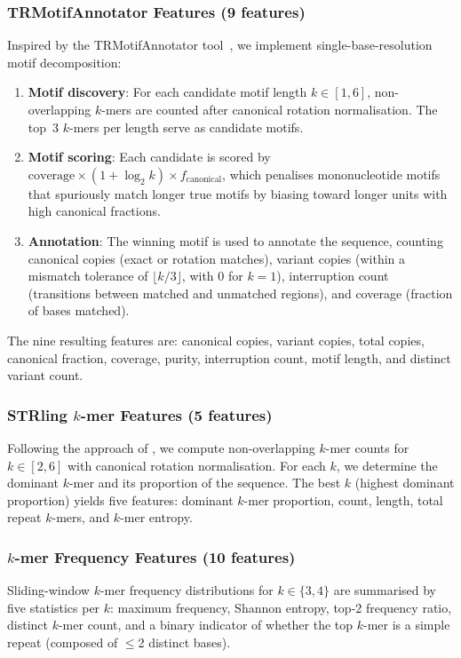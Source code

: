 \documentclass[11pt,twocolumn]{article}
\begin{document}
\subsubsection{TRMotifAnnotator Features (9 features)}
\label{sec:trmotif}
Inspired by the TRMotifAnnotator tool~\citep{wf-trs2025}, we implement
single-base-resolution motif decomposition:

\begin{enumerate}[nosep]
    \item \textbf{Motif discovery}: For each candidate motif length
          $k \in [1, 6]$, non-overlapping $k$-mers are counted after
          canonical rotation normalisation.  The top~3 $k$-mers per
          length serve as candidate motifs.
    \item \textbf{Motif scoring}: Each candidate is scored by
          $\text{coverage} \times (1 + \log_2 k) \times f_{\text{canonical}}$,
          which penalises mononucleotide motifs that spuriously match
          longer true motifs by biasing toward longer units with high
          canonical fractions.
    \item \textbf{Annotation}: The winning motif is used to annotate
          the sequence, counting canonical copies (exact or rotation
          matches), variant copies (within a mismatch tolerance of
          $\lfloor k/3 \rfloor$, with 0 for $k=1$), interruption
          count (transitions between matched and unmatched regions),
          and coverage (fraction of bases matched).
\end{enumerate}

The nine resulting features are: canonical copies, variant copies,
total copies, canonical fraction, coverage, purity, interruption count,
motif length, and distinct variant count.

\subsubsection{STRling $k$-mer Features (5 features)}
Following the approach of \citet{dashnow2022}, we compute
non-overlapping $k$-mer counts for $k \in [2, 6]$ with canonical
rotation normalisation.  For each $k$, we determine the dominant
$k$-mer and its proportion of the sequence.  The best $k$ (highest
dominant proportion) yields five features: dominant $k$-mer proportion,
count, length, total repeat $k$-mers, and $k$-mer entropy.

\subsubsection{$k$-mer Frequency Features (10 features)}
Sliding-window $k$-mer frequency distributions for $k \in \{3, 4\}$
are summarised by five statistics per $k$: maximum frequency, Shannon
entropy, top-2 frequency ratio, distinct $k$-mer count, and a binary
indicator of whether the top $k$-mer is a simple repeat (composed of
$\leq$2 distinct bases).
\end{document}
